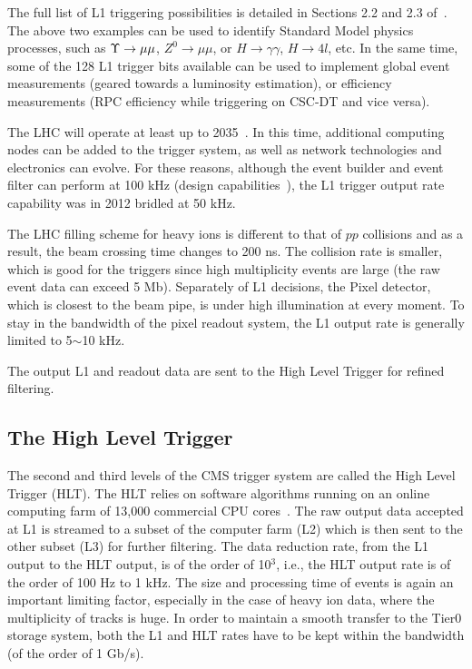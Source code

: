 The full list of L1 triggering possibilities is detailed in Sections 2.2 and 2.3
of~\cite{Dasu:2000ge}. The above two examples can be used to identify
Standard Model physics processes, such as $\Upsilon\to\mu\mu$,
$Z^{0}\to\mu\mu$, or $H\to\gamma\gamma$, $H\to 4l$, etc. In the same time, some of the 128 L1 trigger bits available can
be used to implement global event measurements (geared towards a luminosity estimation), or efficiency measurements (RPC
efficiency while triggering on CSC-DT and vice versa).

The LHC will operate at least up to 2035~\cite{commissioning}. In this
time, additional computing nodes can be added to the trigger
system, as well as network technologies and electronics can
evolve. For these reasons, although the event builder and event filter
can perform at 100 kHz (design
capabilities~\cite{Dasu:2000ge}), the L1 trigger output rate capability was in 2012
bridled at 50 kHz. 


The LHC filling scheme for heavy ions is different to that of $pp$ collisions and as a result, the beam crossing time
changes to 200 ns. The collision rate is smaller, which is good for the triggers since high multiplicity events
are large (the raw event data can exceed 5 Mb). Separately of L1 decisions, the Pixel detector, which is closest to
the beam pipe, is under high illumination at every moment. To stay in the bandwidth of the pixel readout
system, the L1 output rate is generally limited to 5$\sim$10 kHz.


The output L1 and readout data are sent to the High Level Trigger for refined filtering.



\subsection{The High Level Trigger}

The second and third levels of the CMS trigger system are called the High Level Trigger (HLT). The HLT relies on
software algorithms running on an online computing farm of 13,000 commercial CPU cores~\cite{Trocino:2014jya}. The raw output data accepted at L1 is streamed to a subset of the computer farm (L2) which
is then sent to the other subset (L3) for further filtering. The data reduction rate, from the L1 output to the HLT
output, is of the order of 10$^{3}$, i.e., the HLT output rate is of the order of 100 Hz to 1 kHz.  The size and processing time of events is again
an important limiting factor, especially in the case of heavy ion
data, where the multiplicity of tracks is huge. In order to maintain
a smooth transfer to the Tier0 storage system, both the L1 and HLT
rates have to be kept within the bandwidth (of the order of 1 Gb/s).


